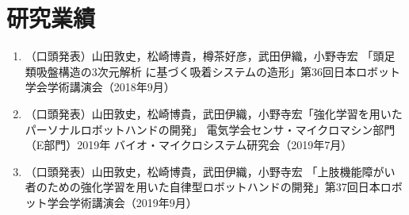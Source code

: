 \chapter*{研究業績}

\begin{enumerate}
    
    \item （口頭発表）山田敦史，松崎博貴，樽茶好彦，武田伊織，小野寺宏 「頭足類吸盤構造の3次元解析 に基づく吸着システムの造形」第36回日本ロボット学会学術講演会（2018年9月）
    \item （口頭発表）山田敦史，松崎博貴，武田伊織，小野寺宏「強化学習を用いたパーソナルロボットハンドの開発」 電気学会センサ・マイクロマシン部門（E部門）2019年 バイオ・マイクロシステム研究会（2019年7月）
    \item （口頭発表）山田敦史，松崎博貴，武田伊織，小野寺宏 「上肢機能障がい者のための強化学習を用いた自律型ロボットハンドの開発」第37回日本ロボット学会学術講演会（2019年9月）
    
\end{enumerate}